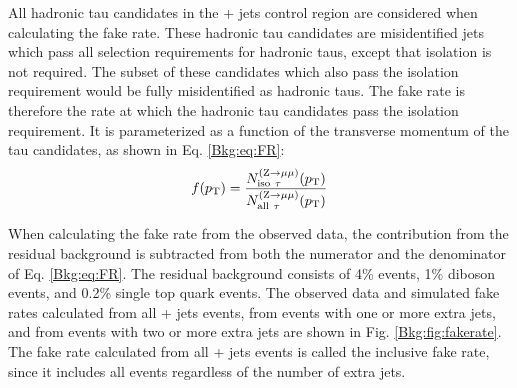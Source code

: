 All hadronic tau candidates in the \Zmm + jets control region are considered when calculating the fake rate. These hadronic tau candidates are misidentified jets which pass all selection requirements for hadronic taus, except that isolation is not required. The subset of these candidates which also pass the isolation requirement would be fully misidentified as hadronic taus. The fake rate is therefore the rate at which the hadronic tau candidates pass the isolation requirement. It is parameterized as a function of the transverse momentum of the tau candidates, as shown in Eq. \eqref{Bkg:eq:FR}:
\begin{equation} f(p_{\mathrm{T}}) = \frac{N_{\text{iso}~\tau}^{(\mathrm{Z} \rightarrow \mu\mu)}(p_{\mathrm{T}})}{N_{\text{all}~\tau}^{(\mathrm{Z} \rightarrow \mu\mu)}(p_{\mathrm{T}})} \label{Bkg:eq:FR} \end{equation}


When calculating the fake rate from the observed data, the contribution from the residual background is subtracted from both the numerator and the denominator of Eq. \eqref{Bkg:eq:FR}. The residual background consists of 4\% \ttbar events, 1\% diboson events, and 0.2\% single top quark events. The observed data and simulated fake rates calculated from all \Zmm + jets events, from events with one or more extra jets, and from events with two or more extra jets are shown in Fig. \ref{Bkg:fig:fakerate}. The fake rate calculated from all \Zmm + jets events is called the inclusive fake rate, since it includes all events regardless of the number of extra jets.

